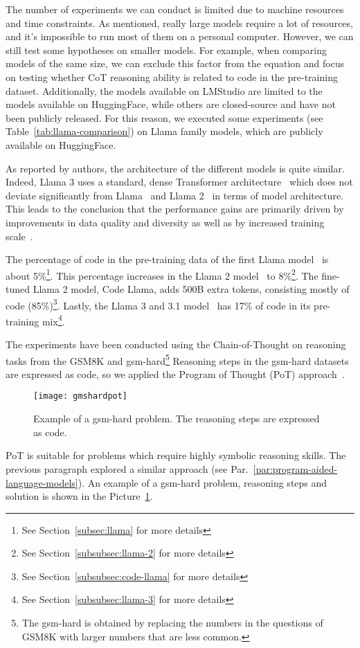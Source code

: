 The number of experiments we can conduct is limited due to machine resources and time constraints.
As mentioned, really large models require a lot of resources, and it's impossible to run most of them on a personal computer.
However, we can still test some hypotheses on smaller models.
For example, when comparing models of the same size, we can exclude this factor from the equation and focus on testing whether CoT reasoning ability is related to code in the pre-training dataset.
Additionally, the models available on LMStudio are limited to the models available on HuggingFace, while others are closed-source and have not been publicly released.
For this reason, we executed some experiments (see Table~\ref{tab:llama-comparison}) on Llama family models, which are publicly available on HuggingFace.

As reported by authors, the architecture of the different models is quite similar.
Indeed, Llama 3 uses a standard, dense Transformer architecture~\cite{vaswani2023attention} which does not deviate significantly from Llama~\cite{touvron2023llama} and Llama 2~\cite{touvron2023llama2} in terms of model architecture.
This leads to the conclusion that the performance gains are primarily driven by improvements in data quality and diversity as well as by increased training scale~\cite{llama3}.

The percentage of code in the pre-training data of the first Llama model~\cite{touvron2023llama} is about 5\%\footnote{See Section~\ref{subsec:llama} for more details}.
This percentage increases in the Llama 2 model~\cite{touvron2023llama2} to 8\%\footnote{See Section~\ref{subsubsec:llama-2} for more details}.
The fine-tuned Llama 2 model, Code Llama\cite{roziere2024codellamaopenfoundation}, adds 500B extra tokens, consisting mostly of code (85\%)\footnote{See Section~\ref{subsubsec:code-llama} for more details}.
Lastly, the Llama 3 and 3.1 model~\cite{llama3} has 17\% of code in its pre-training mix\footnote{See Section~\ref{subsubsec:llama-3} for more details}.

The experiments have been conducted using the Chain-of-Thought on reasoning tasks from the GSM8K and gsm-hard\footnote{The gsm-hard is obtained by replacing the numbers in the questions of GSM8K with larger numbers that are less common.}
Reasoning steps in the gsm-hard datasets are expressed as code, so we applied the Program of Thought (PoT) approach~\cite{chen2022program}.
\begin{figure}[h!]
	\centering
	\texttt{[image: gmshardpot]}
	\caption{Example of a gsm-hard problem. The reasoning steps are expressed as code.}
	\label{fig:pot-example}
\end{figure}
PoT is suitable for problems which require highly symbolic reasoning skills.
The previous paragraph explored a similar approach (see Par.~\ref{par:program-aided-language-models}).
An example of a gsm-hard problem, reasoning steps and solution is shown in the Picture~\ref{fig:pot-example}.

